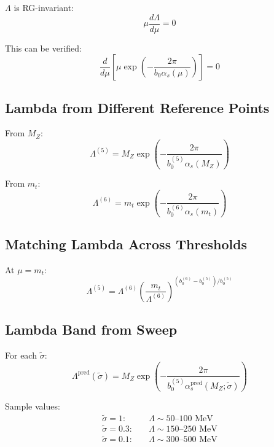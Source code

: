 \documentclass[11pt,a4paper]{article}
\theoremstyle{definition}
\begin{document}
$\Lambda$ is RG-invariant:
\begin{equation}
\label{eq:lambda-rg-inv}
\mu\frac{d\Lambda}{d\mu} = 0
\end{equation}

This can be verified:
\begin{equation}
\label{eq:lambda-verify}
\frac{d}{d\mu}\left[\mu \exp\left(-\frac{2\pi}{b_0\alpha_s(\mu)}\right)\right] = 0
\end{equation}

\subsection{Lambda from Different Reference Points}
\label{subsec:lambda-ref-points}

From $M_Z$:
\begin{equation}
\label{eq:lambda-from-mz}
\Lambda^{(5)} = M_Z \exp\left(-\frac{2\pi}{b_0^{(5)}\alpha_s(M_Z)}\right)
\end{equation}

From $m_t$:
\begin{equation}
\label{eq:lambda-from-mt}
\Lambda^{(6)} = m_t \exp\left(-\frac{2\pi}{b_0^{(6)}\alpha_s(m_t)}\right)
\end{equation}

\subsection{Matching Lambda Across Thresholds}
\label{subsec:lambda-match-thresh}

At $\mu = m_t$:
\begin{equation}
\label{eq:lambda-match-t}
\Lambda^{(5)} = \Lambda^{(6)} \left(\frac{m_t}{\Lambda^{(6)}}\right)^{(b_0^{(6)} - b_0^{(5)})/b_0^{(5)}}
\end{equation}

\subsection{Lambda Band from Sweep}
\label{subsec:lambda-band-sweep}

For each $\tilde{\sigma}$:
\begin{equation}
\label{eq:lambda-band-formula}
\Lambda^{\text{pred}}(\tilde{\sigma}) = M_Z \exp\left(-\frac{2\pi}{b_0^{(5)}\alpha_s^{\text{pred}}(M_Z; \tilde{\sigma})}\right)
\end{equation}

\begin{quarantinebox}
Sample values:
\begin{align}
\label{eq:lambda-sample-1}
\tilde{\sigma} = 1: \quad &\Lambda \sim 50\text{--}100 \text{ MeV} \\
\label{eq:lambda-sample-2}
\tilde{\sigma} = 0.3: \quad &\Lambda \sim 150\text{--}250 \text{ MeV} \\
\label{eq:lambda-sample-3}
\tilde{\sigma} = 0.1: \quad &\Lambda \sim 300\text{--}500 \text{ MeV}
\end{align}
\end{quarantinebox}
\end{document}
